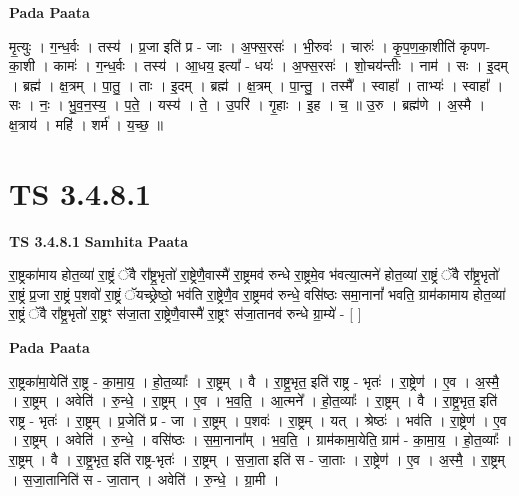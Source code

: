 \documentclass[17pt]{extarticle}
\begin{document}
\textbf{Pada Paata} \newline

मृ॒त्युः । ग॒न्ध॒र्वः । तस्य॑ । प्र॒जा इति॑ प्र - जाः । अ॒फ्स॒रसः॑ । भी॒रुवः॑ । चारुः॑ । कृ॒प॒ण॒का॒शीति॑ कृपण-का॒शी । कामः॑ । ग॒न्ध॒र्वः । तस्य॑ । आ॒धय॒ इत्या᳚ - धयः॑ । अ॒फ्स॒रसः॑ । शो॒चय॑न्तीः । नाम॑ । सः । इ॒दम् । ब्रह्म॑ । क्ष॒त्रम् । पा॒तु॒ । ताः । इ॒दम् । ब्रह्म॑ । क्ष॒त्रम् । पा॒न्तु॒ । तस्मै᳚ । स्वाहा᳚ । ताभ्यः॑ । स्वाहा᳚ । सः । नः॒ । भु॒व॒न॒स्य॒ । प॒ते॒ । यस्य॑ । ते॒ । उ॒परि॑ । गृ॒हाः । इ॒ह । च॒ ॥ उ॒रु । ब्रह्म॑णे । अ॒स्मै । क्ष॒त्राय॑ । महि॑ । शर्म॑ । य॒च्छ॒ ॥  \newline




\section*{ TS 3.4.8.1 }

\textbf{TS 3.4.8.1 } \newline
\textbf{Samhita Paata} \newline

रा॒ष्ट्रका॑माय होत॒व्या॑ रा॒ष्ट्रं ॅवै रा᳚ष्ट्र॒भृतो॑ रा॒ष्ट्रेणै॒वास्मै॑ रा॒ष्ट्रमव॑ रुन्धे रा॒ष्ट्रमे॒व भ॑वत्या॒त्मने॑ होत॒व्या॑ रा॒ष्ट्रं ॅवै रा᳚ष्ट्र॒भृतो॑ रा॒ष्ट्रं प्र॒जा रा॒ष्ट्रं प॒शवो॑ रा॒ष्ट्रं ॅयच्छ्रेष्ठो॒ भव॑ति रा॒ष्ट्रेणै॒व रा॒ष्ट्रमव॑ रुन्धे॒ वसि॑ष्ठः समा॒नानां᳚ भवति॒ ग्राम॑कामाय होत॒व्या॑ रा॒ष्ट्रं ॅवै रा᳚ष्ट्र॒भृतो॑ रा॒ष्ट्रꣳ स॑जा॒ता रा॒ष्ट्रेणै॒वास्मै॑ रा॒ष्ट्रꣳ स॑जा॒तानव॑ रुन्धे ग्रा॒म्ये॑ - [  ] \newline

\textbf{Pada Paata} \newline

रा॒ष्ट्रका॑मा॒येति॑ रा॒ष्ट्र - का॒मा॒य॒ । हो॒त॒व्याः᳚ । रा॒ष्ट्रम् । वै । रा॒ष्ट्र॒भृत॒ इति॑ राष्ट्र - भृतः॑ । रा॒ष्ट्रेण॑ । ए॒व । अ॒स्मै॒ । रा॒ष्ट्रम् । अवेति॑ । रु॒न्धे॒ । रा॒ष्ट्रम् । ए॒व । भ॒व॒ति॒ । आ॒त्मने᳚ । हो॒त॒व्याः᳚ । रा॒ष्ट्रम् । वै । रा॒ष्ट्र॒भृत॒ इति॑ राष्ट्र - भृतः॑ । रा॒ष्ट्रम् । प्र॒जेति॑ प्र - जा । रा॒ष्ट्रम् । प॒शवः॑ । रा॒ष्ट्रम् । यत् । श्रेष्ठः॑ । भव॑ति । रा॒ष्ट्रेण॑ । ए॒व । रा॒ष्ट्रम् । अवेति॑ । रु॒न्धे॒ । वसि॑ष्ठः । स॒मा॒नाना᳚म् । भ॒व॒ति॒ । ग्राम॑कामा॒येति॒ ग्राम॑ - का॒मा॒य॒ । हो॒त॒व्याः᳚ । रा॒ष्ट्रम् । वै । रा॒ष्ट्र॒भृत॒ इति॑ राष्ट्र-भृतः॑ । रा॒ष्ट्रम् । स॒जा॒ता इति॑ स - जा॒ताः । रा॒ष्ट्रेण॑ । ए॒व । अ॒स्मै॒ । रा॒ष्ट्रम् । स॒जा॒तानिति॑ स - जा॒तान् । अवेति॑ । रु॒न्धे॒ । ग्रा॒मी ।  \newline
\end{document}
